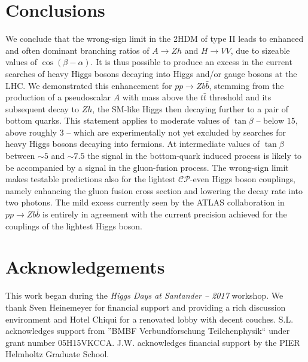 \documentclass[12pt]{article}
\newcommand{\abbrev}{\scalefont{.9}}
\newcommand{\lhc}{{\abbrev LHC}}
\newcommand{\sm}{{\abbrev SM}}
\newcommand{\thdm}{{\abbrev 2HDM}}
\newcommand{\atlas}{{\abbrev ATLAS}}
\newcommand{\cp}{{\abbrev $\mathcal{CP}$}}
\begin{document}
\section{Conclusions}
\label{sec:conclusions}

We conclude that the wrong-sign limit in the \thdm{} of type II leads to enhanced and often dominant branching ratios of $A\to Zh$ and $H\to VV$, due to sizeable values of $\cos(\beta-\alpha)$.
It is thus possible to produce an excess in the current searches of heavy Higgs bosons decaying into Higgs and/or gauge bosons at the \lhc{}.
We demonstrated this enhancement for $pp\to Zb\bar{b}$, stemming from the production of a pseudoscalar $A$ with mass above the $t\bar{t}$ threshold and its subsequent decay to $Zh$, the \sm{}-like Higgs then decaying further to a pair of bottom quarks.
This statement applies to moderate values of $\tan\beta$ -- below $15$, above roughly $3$ -- which are experimentally not yet excluded by searches for heavy Higgs bosons decaying into fermions. At intermediate values of $\tan\beta$ between $\sim 5$ and $\sim 7.5$ the signal in the bottom-quark induced process is likely to be accompanied by a signal in the gluon-fusion process.
The wrong-sign limit makes testable predictions also for the lightest \cp{}-even Higgs boson couplings, namely enhancing the gluon fusion cross section and lowering the decay rate into two photons.
The mild excess currently seen by the \atlas{} collaboration in $pp\to Zb\bar b$ is entirely in agreement with the current precision achieved for the couplings of the lightest Higgs boson.

\section*{Acknowledgements}
This work began during the {\em Higgs Days at Santander -- 2017} workshop.
We thank Sven Heinemeyer for financial support and providing a rich discussion
environment and Hotel Chiqui for a renovated lobby with decent couches.
S.L. acknowledges support from ''BMBF Verbundforschung Teilchenphysik`` under grant number 05H15VKCCA.
J.W. acknowledges financial support by the PIER Helmholtz Graduate School.

{\footnotesize


}
\end{document}
